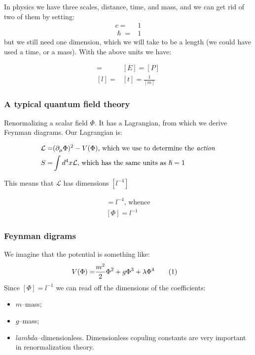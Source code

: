 \documentclass[]{article}
\newcommand\numberthis{\addtocounter{equation}{1}\tag{\theequation}}
\begin{document}
In physics we have three scales, distance, time, and mass, and we can get rid of two of them by setting:
\begin{align*}
	c=&1\\
	\hslash=& 1
\end{align*} 
but we still need one dimension, which we will take to be a length (we could have used a time, or a mass). With the above units we have: 

\begin{align*}
	[m] =& [E]	= [P]\\
	[l] =& [t]	= \frac{1}{[m]}
\end{align*}

\subsubsection{A typical quantum field theory}

Renormalizing a scalar field $\Phi$. It has a Lagrangian, from which we derive Feynman diagrams. Our Lagrangian is:

\begin{align*}
	\mathcal{L} =& (\partial_\mu \Phi)^2 - V(\Phi) \text{, which we use to determine the \emph{action}}\\
	S =& \int d^4 x \mathcal{L} \text{, which has the same units as $\hslash=1$}
\end{align*}

This means that $\mathcal{L}$ has dimensions $[l^{-4}]$

\begin{align*}
	[(\frac{\partial \Phi}{\partial x})^2]=l^{-4} \text{, whence}\\
	[\Phi] = l^{-1}
\end{align*}

\subsubsection{Feynman digrams}

We imagine that the potential is something like:
\begin{align*}
	V(\Phi) =& \frac{m^2}{2} \Phi^2 + g \Phi^3 + \lambda \Phi^4 \numberthis \label{eq:potential}
\end{align*}
Since $[\Phi] = l^{-1}$ we can read off the dimensions of the coefficients:
\begin{itemize}
	\item $m$--mass;
	\item $g$--mass;
	\item $lambda$--dimensionless. Dimensionless copuling constants are very important in renormalization theory.
\end{itemize}
\end{document}
